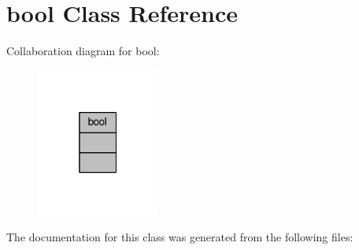 \hypertarget{classbool}{}\section{bool Class Reference}
\label{classbool}


Collaboration diagram for bool\+:
\nopagebreak
\begin{figure}[H]
\begin{center}
\leavevmode
\includegraphics[width=115pt]{classbool__coll__graph}
\end{center}
\end{figure}


The documentation for this class was generated from the following files\+: